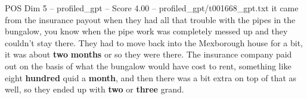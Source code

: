 \begin{textsample}{POS Dim 5 – profiled\_gpt – Score 4.00 – profiled\_gpt/t001668\_gpt.txt}  \label{ex:f5_pos_027}
it came from the insurance payout when they had all that trouble with the pipes in the bungalow, you know when the pipe work was completely messed up and they couldn't stay there.
They had to move back into the Mexborough house for a bit, it was about \textbf{two} \textbf{months} or so they were there.
The insurance company paid out on the basis of what the bungalow would have cost to rent, something like eight \textbf{hundred} quid a \textbf{month}, and then there was a bit extra on top of that as well, so they ended up with \textbf{two} or \textbf{three} grand.

\end{textsample}
